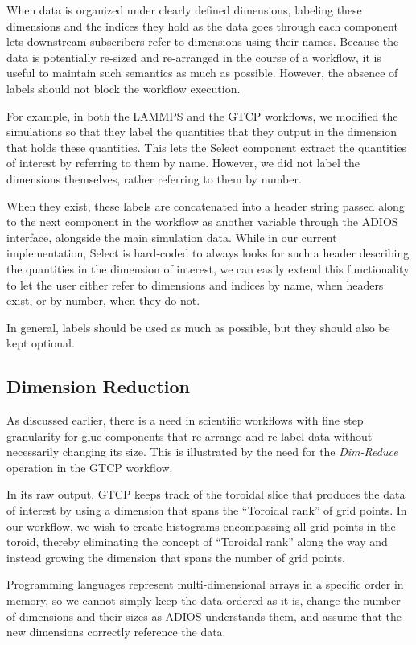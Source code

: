 When data is organized under clearly defined
dimensions, labeling these
dimensions and the indices they hold
as the data goes through each component
lets downstream subscribers
refer to dimensions using their names.
Because the data is potentially re-sized
and re-arranged in the course of a workflow,
it is useful to maintain such
semantics as much as possible. However,
the absence of labels should not block
the workflow execution.

For example, in both the LAMMPS and the GTCP workflows, we modified
the simulations so that they label the
quantities that they output in the
dimension that holds
these quantities. This lets the Select component
extract the quantities of interest by referring
to them by name. However, we did not label the dimensions
themselves, rather referring to them by number. 

When they exist, these labels are concatenated
into a header string passed along to the
next component in the workflow as another variable
through the ADIOS interface, alongside the main
simulation data.
While in our current implementation, Select is hard-coded to
always looks for such a header describing the quantities
in the dimension of interest, 
we can easily extend this functionality to let the user either refer
to dimensions and indices by name, when headers exist, or by number,
when they do not.

In general, labels should be used as much as possible, but they
should also be kept optional.

\subsection{Dimension Reduction}
\label{subsec:dimreduce}
As discussed earlier, there is a need in
scientific workflows with fine
step granularity for glue components
that re-arrange and re-label data
without necessarily changing its size.
This is illustrated by the need for the {\em Dim-Reduce}
operation in the GTCP workflow.

In its raw output, GTCP keeps track of the
toroidal slice that produces the data of interest by using a
dimension that spans the ``Toroidal rank'' of grid points.
In our workflow, we
wish to create histograms encompassing all grid
points in the toroid, thereby
eliminating the concept of ``Toroidal rank''
along the way
and instead growing the dimension
that spans the number of grid points.

Programming languages represent multi-dimensional
arrays in a specific order in
memory, so we cannot simply keep the data
ordered as it is, change the number
of dimensions and their sizes as ADIOS understands them, 
and assume that the new dimensions correctly
reference the data.

